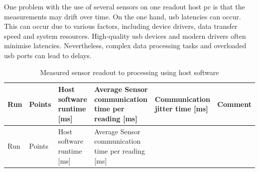 One problem with the use of several sensors on one readout host \gls{pc}
is that the measurements may drift over time. On the one hand, \gls{usb}
latencies can occur. This can occur due to various factors, including
device drivers, data transfer speed and system resources. High-quality
\gls{usb} devices and modern drivers often minimise latencies.
Nevertheless, complex data processing tasks and overloaded \gls{usb}
ports can lead to delays.

\begin{longtable}[]{@{}llllll@{}}
\caption{Measured sensor readout to processing using host software
\label{Measured_sensor_readout_to_processing_using_host_software.csv}}\tabularnewline
\toprule
\begin{minipage}[b]{0.02\columnwidth}\raggedright
Run\strut
\end{minipage} & \begin{minipage}[b]{0.04\columnwidth}\raggedright
Points\strut
\end{minipage} & \begin{minipage}[b]{0.16\columnwidth}\raggedright
Host software runtime {[}ms{]}\strut
\end{minipage} & \begin{minipage}[b]{0.32\columnwidth}\raggedright
Average Sensor communication time per reading {[}ms{]}\strut
\end{minipage} & \begin{minipage}[b]{0.20\columnwidth}\raggedright
Communication jitter time {[}ms{]}\strut
\end{minipage} & \begin{minipage}[b]{0.09\columnwidth}\raggedright
Comment\strut
\end{minipage}\tabularnewline
\midrule
\endfirsthead
\toprule
\begin{minipage}[b]{0.02\columnwidth}\raggedright
Run\strut
\end{minipage} & \begin{minipage}[b]{0.04\columnwidth}\raggedright
Points\strut
\end{minipage} & \begin{minipage}[b]{0.16\columnwidth}\raggedright
Host software runtime {[}ms{]}\strut
\end{minipage} & \begin{minipage}[b]{0.32\columnwidth}\raggedright
Average Sensor communication time per reading {[}ms{]}\strut
\end{minipage} & \begin{minipage}[b]{0.20\columnwidth}\raggedright

\end{minipage}
\end{longtable}

